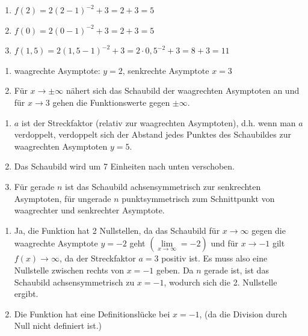\begin{Answer}[ref=HyperbelA2]
	\begin{enumerate}[label=\alph*)]
		\item \(f(2)=2(2-1)^{-2}+3=2+3=5\)
		\item \(f(0)=2(0-1)^{-2}+3=2+3=5\)
		\item \(f(1,5)=2(1,5-1)^{-2}+3=2\cdot0,5^{-2}+3=8+3=11\)
	\end{enumerate}
\end{Answer}
\begin{Answer}[ref=HyperbelA3]
	\begin{enumerate}[label=\alph*)]
		\item waagrechte Asymptote: \(y=2\), senkrechte Asymptote \(x=3\)
		\item Für \(x\to\pm\infty\) nähert sich das Schaubild der waagrechten Asymptoten an und für \(x\to 3\) gehen die Funktionswerte gegen \(\pm\infty\).
	\end{enumerate}
\end{Answer}
\begin{Answer}[ref=HyperbelA4]
	\begin{enumerate}[label=\alph*)]
		\item \(a\) ist der Streckfaktor (relativ zur waagrechten Asymptoten), d.h. wenn man \(a\) verdoppelt, verdoppelt sich der Abstand jedes Punktes des Schaubildes zur waagrechten Asymptoten \(y=5\).
		\item Das Schaubild wird um 7 Einheiten nach unten verschoben.
		\item Für gerade \(n\) ist das Schaubild achsensymmetrisch zur senkrechten Asymptoten, für ungerade \(n\) punktsymmetrisch zum Schnittpunkt von waagrechter und senkrechter Asymptote.
	\end{enumerate}

\end{Answer}
\begin{Answer}[ref=HyperbelA5]
	\begin{enumerate}[label=\alph*)]
		\item Ja, die Funktion hat 2 Nullstellen, da das Schaubild für \(x\to \infty\) gegen die waagrechte Asymptote \(y=-2\) geht \(\left(\lim\limits_{x\to\infty}=-2\right)\) und für \(x\to -1\) gilt \(f(x)\to\infty\), da der Streckfaktor \(a=3\) positiv ist. Es muss also eine Nullstelle zwischen rechts von \(x=-1\) geben. Da \(n\) gerade ist, ist das Schaubild achsensymmetrisch zu \(x=-1\), wodurch sich die 2. Nullstelle ergibt. 
		\item Die Funktion hat eine Definitionslücke bei \(x=-1\), (da die Division durch Null nicht definiert ist.)
	\end{enumerate}

\end{Answer}
